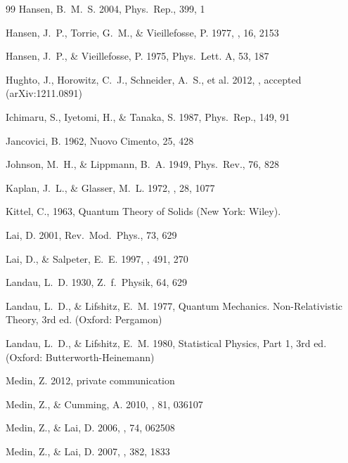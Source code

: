 \documentclass[traditabstract]{aa}
\begin{document}
\begin{thebibliography}{99}
Hansen, B.~M.~S.
2004,
Phys.\ Rep., 399, 1

Hansen, J.~P., Torrie, G.~M., \& Vieillefosse, P.
1977,
\pra, {16}, 2153

Hansen, J.~P., \& Vieillefosse, P.
1975,
Phys.\ Lett. A, 53, 187

Hughto, J., Horowitz, C.~J., Schneider, A.~S., et al.
2012,
\pre, accepted (arXiv:1211.0891)

Ichimaru, S., Iyetomi, H., \& Tanaka, S.
1987,
Phys.\ Rep., {149}, 91

Jancovici, B.
1962,
Nuovo Cimento, 25, 428

Johnson, M.~H., \& Lippmann, B.~A.
1949,
Phys.~Rev., 76, 828

Kaplan, J.~L., \& Glasser, M.~L.
1972,
\prl, 28, 1077

Kittel, C., 1963,
{Quantum Theory of Solids}
(New York: Wiley).

Lai, D.
2001,
Rev.\ Mod.\ Phys., 73, 629

Lai, D., \& Salpeter, E.~E.
1997,
\apj, 491, 270

Landau, L.~D.
 1930,
Z.\ f.\ Physik, 64, 629

Landau, L.~D., \& Lifshitz, E.~M.
 1977,
{Quantum Mechanics. Non-Relativistic Theory}, 3rd ed.
(Oxford: Pergamon)

Landau, L.~D., \& Lifshitz, E.~M.
1980,
{Statistical Physics, Part 1}, 3rd ed.
(Oxford: Butterworth-Heinemann)

Medin, Z.
2012,
private communication

Medin, Z., \& Cumming, A.
2010,
\pre, 81, 036107

Medin, Z., \& Lai, D.
2006,
\pra, 74, 062508

Medin, Z., \& Lai, D.
2007,
\mnras, 382, 1833


\end{thebibliography}
\end{document}

